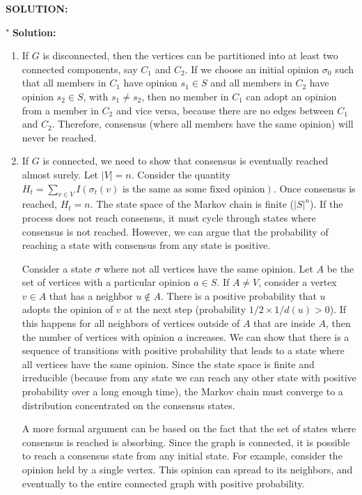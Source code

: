 \begin{enumerate}
\ifdefined\template
\begin{shaded}
\textbf{SOLUTION:}
\ifdefined\sol


"
\textbf{Solution:}

\begin{enumerate}
\item {} If $G$ is disconnected, then the vertices can be partitioned into at least two connected components, say $C_1$ and $C_2$. If we choose an initial opinion $\sigma_0$ such that all members in $C_1$ have opinion $s_1 \in S$ and all members in $C_2$ have opinion $s_2 \in S$, with $s_1 \neq s_2$, then no member in $C_1$ can adopt an opinion from a member in $C_2$ and vice versa, because there are no edges between $C_1$ and $C_2$. Therefore, consensus (where all members have the same opinion) will never be reached.

\item {} If $G$ is connected, we need to show that consensus is eventually reached almost surely. Let $|V| = n$. Consider the quantity $H_t = \sum_{v \in V} I(\sigma_t(v) \text{ is the same as some fixed opinion})$. Once consensus is reached, $H_t = n$. The state space of the Markov chain is finite ($|S|^n$). If the process does not reach consensus, it must cycle through states where consensus is not reached. However, we can argue that the probability of reaching a state with consensus from any state is positive.

Consider a state $\sigma$ where not all vertices have the same opinion. Let $A$ be the set of vertices with a particular opinion $a \in S$. If $A \neq V$, consider a vertex $v \in A$ that has a neighbor $u \notin A$. There is a positive probability that $u$ adopts the opinion of $v$ at the next step (probability $1/2 \times 1/d(u) > 0$). If this happens for all neighbors of vertices outside of $A$ that are inside $A$, then the number of vertices with opinion $a$ increases. We can show that there is a sequence of transitions with positive probability that leads to a state where all vertices have the same opinion. Since the state space is finite and irreducible (because from any state we can reach any other state with positive probability over a long enough time), the Markov chain must converge to a distribution concentrated on the consensus states.

A more formal argument can be based on the fact that the set of states where consensus is reached is absorbing. Since the graph is connected, it is possible to reach a consensus state from any initial state. For example, consider the opinion held by a single vertex. This opinion can spread to its neighbors, and eventually to the entire connected graph with positive probability.


\end{enumerate}
\end{shaded}
\end{enumerate}
